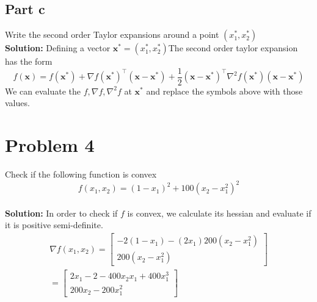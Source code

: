 \documentclass[11pt]{article}
\begin{document}
\subsection{Part c}
Write the second order Taylor expansions around a point $(x_1^*, x_2^*)$
\\
\textbf{Solution: }
Defining a vector $\textbf{x}^* = (x_1^*, x_2^*)$The second order taylor expansion has the form
\begin{equation*}
  f(\textbf{x}) = f(\textbf{x}^*) + \nabla f(\textbf{x}^*)^\top (\textbf{x} - \textbf{x}^*) + \frac{1}{2} (\textbf{x} - \textbf{x}^*)^\top \nabla^2 f(\textbf{x}^*)(\textbf{x} - \textbf{x}^*)
\end{equation*}
We can evaluate the $f, \nabla f, \nabla^2 f$ at $\textbf{x}^*$ and replace the symbols above with those values.

\section{Problem 4}
Check if the following function is convex
\begin{equation*}
  f(x_1, x_2) = (1 - x_1)^2 + 100(x_2 - x_1^2)^2
\end{equation*}
\\
\textbf{Solution: }
In order to check if $f$ is convex, we calculate its hessian and evaluate if it is positive semi-definite.
\begin{align*}
  \nabla f(x_1, x_2) = 
  \begin{bmatrix}
    -2(1-x_1) - (2x_1) 200(x_2 - x_1^2) \\
    200(x_2 - x_1^2)
  \end{bmatrix}
  \\
  = 
  \begin{bmatrix}
    2x_1-2 - 400x_2 x_1 + 400x_1^3 \\
    200x_2 - 200x_1^2
  \end{bmatrix}
\end{align*}
\end{document}
